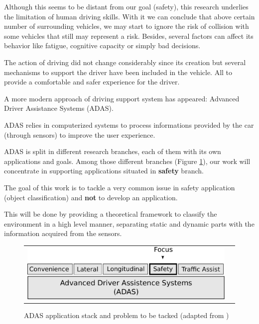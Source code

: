 Although this seems to be distant from our goal (safety), this research underlies the limitation of human driving skills. With it we can conclude that above certain number of surrounding vehicles, we may start to ignore the risk of collision with some vehicles that still may represent a risk. Besides, several factors can affect its behavior like fatigue, cognitive capacity or simply bad decisions.


The action of driving did not change considerably since its creation but several mechanisms to support the driver have been included in the vehicle. All to provide a comfortable and safer experience for the driver\cite{riener2010sensor}.

A more modern approach of driving support system has appeared: Advanced Driver Assistance Systems (ADAS). 

ADAS relies in computerized systems to process informations provided by the car (through sensors) to improve the user experience. 

ADAS is split in different research branches, each of them with its own applications and goals. Among those different branches (Figure \ref{fig:sensor:target}), our work will concentrate in supporting applications situated in \textbf{safety} branch. 

The goal of this work is to tackle a very common issue in safety application (object classification) and \textbf{not} to develop an application.

This will be done by providing a theoretical framework to classify the environment in a high level manner, separating static and dynamic parts with the information acquired from the sensors.

\begin{figure}[h]
\centering
	\begin{tabular}{lr}\\
		\includegraphics[scale=0.7]{img/fig:sensor:target} 
	\end{tabular}
	\caption{ADAS application stack and problem to be tacked (adapted from \cite{riener2010sensor})}
	\label{fig:sensor:target}
\end{figure}

